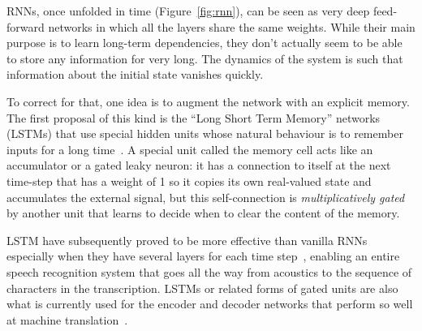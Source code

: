 \documentclass[10pts]{article}
\begin{document}

RNNs, once unfolded in time (Figure~\ref{fig:rnn}), can be seen as very deep
feed-forward networks in which all the layers share the same weights.
While their main purpose is to learn long-term dependencies, they
don't actually seem to be able to store any information for very
long. The dynamics of the system is such that information about the
initial state vanishes quickly. 

To correct for that, one idea is to augment the network with an
explicit memory. The first proposal of this kind is the ``Long Short
Term Memory'' networks (LSTMs) that use special hidden units whose
natural behaviour is to remember inputs for a long
time~\citep{Hochreiter+Schmidhuber-1997}.  
A special unit called the memory cell
acts like an accumulator or a gated leaky neuron: it has a connection
to itself at the next time-step that has a weight of 1 so it copies
its own real-valued state and accumulates the external signal, but
this self-connection is {\em multiplicatively gated} by another unit
that learns to decide when to clear the content of the memory.

LSTM have subsequently proved to be more effective than vanilla RNNs
especially when they have several layers for each time step~\citep{Graves-et-al-ICASSP2013},
enabling an entire speech recognition system that goes
all the way from acoustics to the
sequence of characters in the transcription.  LSTMs or related forms
of gated units are also what is currently used for the encoder and
decoder networks that perform so well at machine
translation~\citep{Bahdanau-et-al-ICLR2015-small,Sutskever-et-al-NIPS2014}.
\end{document}
